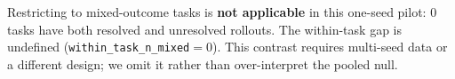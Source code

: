 \documentclass{article}
\begin{document}
Restricting to mixed-outcome tasks is \textbf{not applicable} in this one-seed pilot: $0$ tasks have both resolved and unresolved rollouts.
The within-task gap is undefined (\texttt{within\_task\_n\_mixed}${}=0$).
This contrast requires multi-seed data or a different design; we omit it rather than over-interpret the pooled null.

\end{document}
